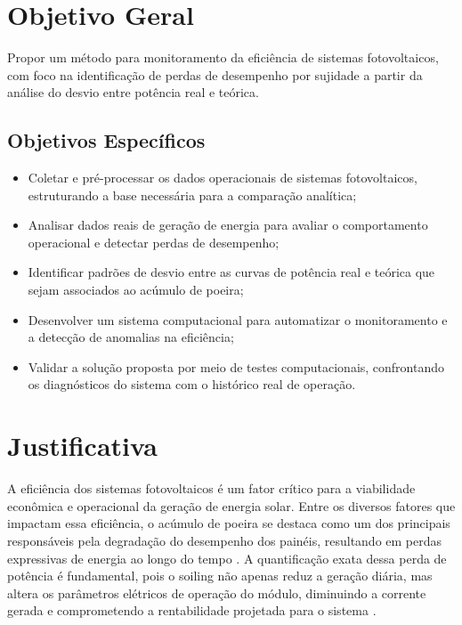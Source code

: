 \documentclass{UNESC}
\begin{document}
\section{Objetivo Geral}

Propor um método para monitoramento da eficiência de sistemas fotovoltaicos, com foco na identificação de perdas de desempenho por sujidade a partir da análise do desvio entre potência real e teórica.

\subsection{Objetivos Específicos}

\begin{itemize}

\item Coletar e pré-processar os dados operacionais de sistemas fotovoltaicos, estruturando a base necessária para a comparação analítica;

\item Analisar dados reais de geração de energia para avaliar o comportamento operacional e detectar perdas de desempenho;

\item Identificar padrões de desvio entre as curvas de potência real e teórica que sejam associados ao acúmulo de poeira;

\item Desenvolver um sistema computacional para automatizar o monitoramento e a detecção de anomalias na eficiência;

\item Validar a solução proposta por meio de testes computacionais, confrontando os diagnósticos do sistema com o histórico real de operação.

\end{itemize}

\section{Justificativa}

A eficiência dos sistemas fotovoltaicos é um fator crítico para a viabilidade econômica e operacional da geração de energia solar. Entre os diversos fatores que impactam essa eficiência, o acúmulo de poeira se destaca como um dos principais responsáveis pela degradação do desempenho dos painéis, resultando em perdas expressivas de energia ao longo do tempo \cite{abuzaid2022, Araujo_Marques}. A quantificação exata dessa perda de potência é fundamental, pois o soiling não apenas reduz a geração diária, mas altera os parâmetros elétricos de operação do módulo, diminuindo a corrente gerada e comprometendo a rentabilidade projetada para o sistema \cite{Araujo_Marques}.
\end{document}
